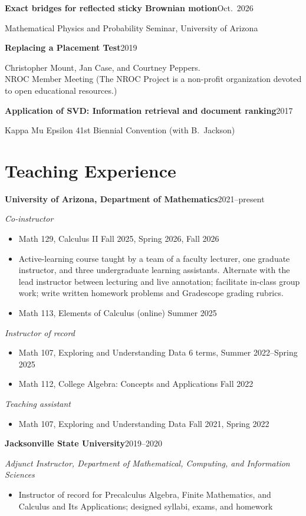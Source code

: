 \documentclass[11pt,letterpaper]{article}
\newcommand{\entry}[2]{\Needspace{4\baselineskip}\noindent\textbf{#1}\hfill #2\par}
\newcommand{\subentry}[1]{\noindent\textit{#1}\par}
\newcommand{\course}[2]{\item #1 \hfill {\small #2}}
\begin{document}
\medskip
\entry{Exact bridges for reflected sticky Brownian motion}{Oct.\ 2026}
Mathematical Physics and Probability Seminar,
University of Arizona

\medskip
\entry{Replacing a Placement Test}{2019}
Christopher Mount, Jan Case, and Courtney Peppers.\\
NROC Member Meeting (The NROC Project is a non-profit organization
devoted to open educational resources.)

\medskip
\entry{Application of SVD: Information retrieval and document ranking}{2017}
Kappa Mu Epsilon 41st Biennial Convention (with B.~Jackson)

\section{Teaching Experience}
\entry{University of Arizona, Department of Mathematics}{2021--present}

\smallskip
\textit{Co-instructor}
\begin{itemize}
  \course{Math 129, Calculus II}{Fall 2025, Spring 2026, Fall 2026}
  \item[] \small Active-learning course taught by a team of a faculty lecturer,
        one graduate instructor, and three undergraduate learning assistants.
        Alternate with the lead instructor between lecturing and live
        annotation; facilitate in-class group work; write written homework
        problems and Gradescope grading rubrics. \normalsize
  \course{Math 113, Elements of Calculus (online)}{Summer 2025}
\end{itemize}

\textit{Instructor of record}
\begin{itemize}
  \course{Math 107, Exploring and Understanding Data}{6 terms, Summer 2022--Spring 2025}
  \course{Math 112, College Algebra: Concepts and Applications}{Fall 2022}
\end{itemize}

\textit{Teaching assistant}
\begin{itemize}
  \course{Math 107, Exploring and Understanding Data}{Fall 2021, Spring 2022}
\end{itemize}

\medskip
\entry{Jacksonville State University}{2019--2020}
\subentry{Adjunct Instructor, Department of Mathematical, Computing, and Information Sciences}
\begin{itemize}
  \item Instructor of record for Precalculus Algebra, Finite Mathematics,
        and Calculus and Its Applications; designed syllabi, exams,
        and homework
\end{itemize}
\end{document}
